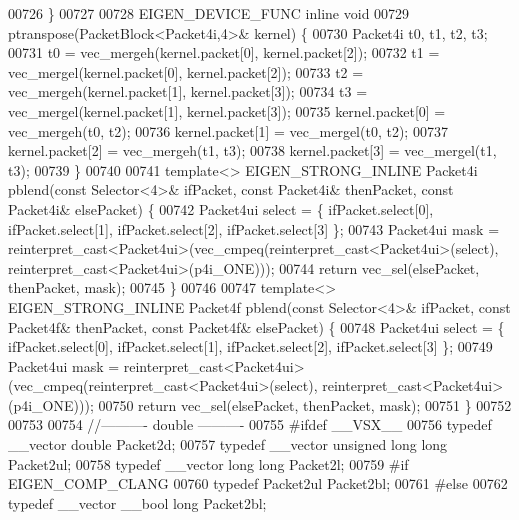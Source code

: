 \begin{DoxyCode}
{00726 \}
00727 
00728 EIGEN\_DEVICE\_FUNC \textcolor{keyword}{inline} \textcolor{keywordtype}{void}
00729 ptranspose(PacketBlock<Packet4i,4>& kernel) \{
00730   Packet4i t0, t1, t2, t3;
00731   t0 = vec\_mergeh(kernel.packet[0], kernel.packet[2]);
00732   t1 = vec\_mergel(kernel.packet[0], kernel.packet[2]);
00733   t2 = vec\_mergeh(kernel.packet[1], kernel.packet[3]);
00734   t3 = vec\_mergel(kernel.packet[1], kernel.packet[3]);
00735   kernel.packet[0] = vec\_mergeh(t0, t2);
00736   kernel.packet[1] = vec\_mergel(t0, t2);
00737   kernel.packet[2] = vec\_mergeh(t1, t3);
00738   kernel.packet[3] = vec\_mergel(t1, t3);
00739 \}
00740 
00741 \textcolor{keyword}{template}<> EIGEN\_STRONG\_INLINE Packet4i pblend(\textcolor{keyword}{const} Selector<4>& ifPacket, \textcolor{keyword}{const} Packet4i& thenPacket, \textcolor{keyword}{
      const} Packet4i& elsePacket) \{
00742   Packet4ui select = \{ ifPacket.select[0], ifPacket.select[1], ifPacket.select[2], ifPacket.select[3] \};
00743   Packet4ui mask = \textcolor{keyword}{reinterpret\_cast<}Packet4ui\textcolor{keyword}{>}(vec\_cmpeq(reinterpret\_cast<Packet4ui>(select), 
      reinterpret\_cast<Packet4ui>(p4i\_ONE)));
00744   \textcolor{keywordflow}{return} vec\_sel(elsePacket, thenPacket, mask);
00745 \}
00746 
00747 \textcolor{keyword}{template}<> EIGEN\_STRONG\_INLINE Packet4f pblend(\textcolor{keyword}{const} Selector<4>& ifPacket, \textcolor{keyword}{const} Packet4f& thenPacket, \textcolor{keyword}{
      const} Packet4f& elsePacket) \{
00748   Packet4ui select = \{ ifPacket.select[0], ifPacket.select[1], ifPacket.select[2], ifPacket.select[3] \};
00749   Packet4ui mask = \textcolor{keyword}{reinterpret\_cast<}Packet4ui\textcolor{keyword}{>}(vec\_cmpeq(reinterpret\_cast<Packet4ui>(select), 
      reinterpret\_cast<Packet4ui>(p4i\_ONE)));
00750   \textcolor{keywordflow}{return} vec\_sel(elsePacket, thenPacket, mask);
00751 \}
00752 
00753 
00754 \textcolor{comment}{//---------- double ----------}
00755 \textcolor{preprocessor}{#ifdef \_\_VSX\_\_}
00756 \textcolor{keyword}{typedef} \_\_vector \textcolor{keywordtype}{double}              Packet2d;
00757 \textcolor{keyword}{typedef} \_\_vector \textcolor{keywordtype}{unsigned} \textcolor{keywordtype}{long} \textcolor{keywordtype}{long}  Packet2ul;
00758 \textcolor{keyword}{typedef} \_\_vector \textcolor{keywordtype}{long} \textcolor{keywordtype}{long}           Packet2l;
00759 \textcolor{preprocessor}{#if EIGEN\_COMP\_CLANG}
00760 \textcolor{keyword}{typedef} Packet2ul                    Packet2bl;
00761 \textcolor{preprocessor}{#else}
00762 \textcolor{keyword}{typedef} \_\_vector \_\_bool \textcolor{keywordtype}{long}         Packet2bl;
}
\end{DoxyCode}
